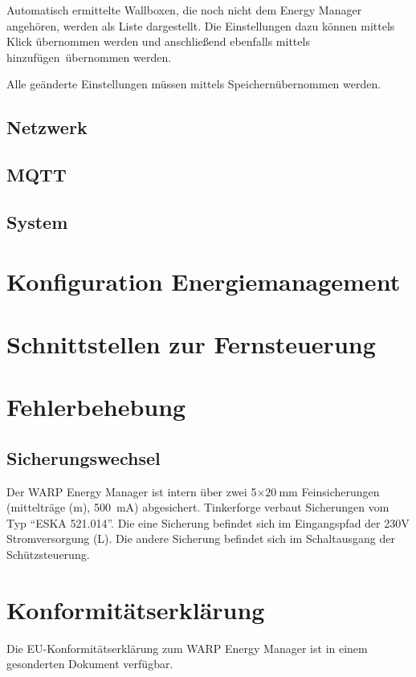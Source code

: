 \documentclass[a4paper,10pt]{article}
\begin{document}
\begin{multicols*}{2}
	Automatisch ermittelte Wallboxen, die noch nicht dem Energy Manager
	angehören, werden als Liste dargestellt. Die Einstellungen dazu können
	mittels Klick übernommen werden und anschließend ebenfalls mittels \glqq
	hinzufügen\grqq~übernommen werden.

	Alle geänderte Einstellungen müssen mittels \glqq Speichern\grqq übernommen 
	werden.


	\subsection{Netzwerk}
	\subsection{MQTT}
	\subsection{System}


	\section{Konfiguration Energiemanagement}

	\section{Schnittstellen zur Fernsteuerung}

	\section{Fehlerbehebung}

	\subsection{Sicherungswechsel}
	Der WARP Energy Manager ist intern über zwei 5$\times\SI{20}{\milli\meter}$ Feinsicherungen (mittelträge (m), \SI{500}{\milli\ampere}) abgesichert.
	Tinkerforge verbaut Sicherungen vom Typ \enquote{ESKA 521.014}. Die eine
	Sicherung befindet sich im Eingangspfad der 230V Stromversorgung (L). Die
	andere Sicherung befindet sich im Schaltausgang der Schützsteuerung.

	\section{Konformitätserklärung}
	Die EU-Konformitätserklärung zum WARP Energy Manager ist in einem gesonderten Dokument verfügbar.


\end{multicols*}
\end{document}
